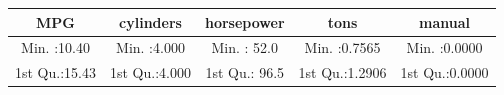 \documentclass[]{article}
\begin{document}
\begin{longtable}[c]{@{}ccccc@{}}
\toprule
\begin{minipage}[b]{0.17\columnwidth}\centering\strut
MPG
\strut\end{minipage} &
\begin{minipage}[b]{0.17\columnwidth}\centering\strut
cylinders
\strut\end{minipage} &
\begin{minipage}[b]{0.17\columnwidth}\centering\strut
horsepower
\strut\end{minipage} &
\begin{minipage}[b]{0.18\columnwidth}\centering\strut
tons
\strut\end{minipage} &
\begin{minipage}[b]{0.18\columnwidth}\centering\strut
manual
\strut\end{minipage}\tabularnewline
\midrule
\endhead
\begin{minipage}[t]{0.17\columnwidth}\centering\strut
Min. :10.40
\strut\end{minipage} &
\begin{minipage}[t]{0.17\columnwidth}\centering\strut
Min. :4.000
\strut\end{minipage} &
\begin{minipage}[t]{0.17\columnwidth}\centering\strut
Min. : 52.0
\strut\end{minipage} &
\begin{minipage}[t]{0.18\columnwidth}\centering\strut
Min. :0.7565
\strut\end{minipage} &
\begin{minipage}[t]{0.18\columnwidth}\centering\strut
Min. :0.0000
\strut\end{minipage}\tabularnewline
\begin{minipage}[t]{0.17\columnwidth}\centering\strut
1st Qu.:15.43
\strut\end{minipage} &
\begin{minipage}[t]{0.17\columnwidth}\centering\strut
1st Qu.:4.000
\strut\end{minipage} &
\begin{minipage}[t]{0.17\columnwidth}\centering\strut
1st Qu.: 96.5
\strut\end{minipage} &
\begin{minipage}[t]{0.18\columnwidth}\centering\strut
1st Qu.:1.2906
\strut\end{minipage} &
\begin{minipage}[t]{0.18\columnwidth}\centering\strut
1st Qu.:0.0000
\strut\end{minipage}\tabularnewline

\end{longtable}
\end{document}
